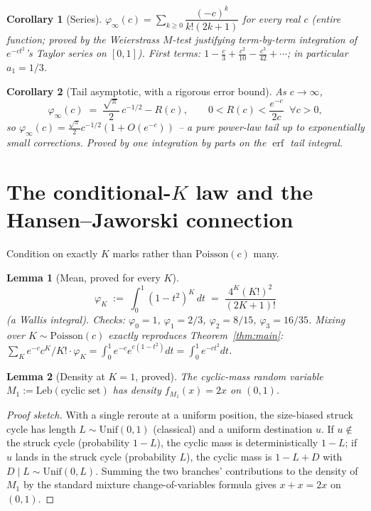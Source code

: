 \documentclass[11pt]{article}
\newtheorem{lemma}{Lemma}
\newtheorem{corollary}{Corollary}
\theoremstyle{remark}
\newcommand{\phiinf}{\varphi_\infty}
\newcommand{\Unif}{\mathrm{Unif}}
\begin{document}
\begin{corollary}[Series]
\label{cor:series}
$\phiinf(c) = \sum_{k\ge0} \dfrac{(-c)^k}{k!(2k+1)}$ for every real $c$
(entire function; proved by the Weierstrass $M$-test justifying
term-by-term integration of $e^{-ct^2}$'s Taylor series on $[0,1]$).
First terms: $1-\tfrac{c}{3}+\tfrac{c^2}{10}-\tfrac{c^3}{42}+\cdots$; in
particular $a_1=1/3$.
\end{corollary}

\begin{corollary}[Tail asymptotic, with a rigorous error bound]
\label{cor:tail}
As $c\to\infty$,
\[
  \phiinf(c) \;=\; \frac{\sqrt\pi}{2}\,c^{-1/2} - R(c), \qquad 0 < R(c) < \frac{e^{-c}}{2c} \;\;\forall c>0,
\]
so $\phiinf(c) = \tfrac{\sqrt\pi}{2}c^{-1/2}(1+O(e^{-c}))$ -- a pure
power-law tail up to exponentially small corrections. Proved by one
integration by parts on the $\operatorname{erf}$ tail integral.
\end{corollary}

\section{The conditional-$K$ law and the Hansen--Jaworski connection}
\label{sec:conditionalK}

Condition on exactly $K$ marks rather than $\mathrm{Poisson}(c)$ many.

\begin{lemma}[Mean, proved for every $K$]
\label{lem:mean}
\[
  \varphi_K \;:=\; \int_0^1 (1-t^2)^K\,dt \;=\; \frac{4^K (K!)^2}{(2K+1)!}
\]
(a Wallis integral). Checks: $\varphi_0=1$, $\varphi_1=2/3$,
$\varphi_2=8/15$, $\varphi_3=16/35$. Mixing over $K\sim\mathrm{Poisson}(c)$
exactly reproduces Theorem~\ref{thm:main}:
$\sum_K e^{-c}c^K/K!\cdot\varphi_K = \int_0^1 e^{-c}e^{c(1-t^2)}dt = \int_0^1 e^{-ct^2}dt$.
\end{lemma}

\begin{lemma}[Density at $K=1$, proved]
\label{lem:density1}
The cyclic-mass random variable $M_1:=\mathrm{Leb}(\text{cyclic set})$
has density $f_{M_1}(x)=2x$ on $(0,1)$.
\end{lemma}

\begin{proof}[Proof sketch]
With a single reroute at a uniform position, the size-biased struck
cycle has length $L\sim\Unif(0,1)$ (classical) and a uniform destination
$u$. If $u\notin$ the struck cycle (probability $1-L$), the cyclic mass
is deterministically $1-L$; if $u$ lands in the struck cycle (probability
$L$), the cyclic mass is $1-L+D$ with $D\mid L\sim\Unif(0,L)$. Summing
the two branches' contributions to the density of $M_1$ by the standard
mixture change-of-variables formula gives $x+x=2x$ on $(0,1)$.
\end{proof}
\end{document}
